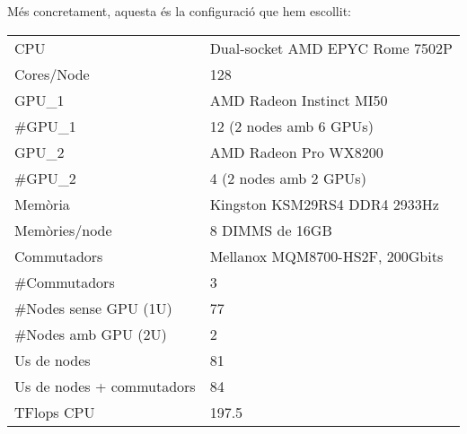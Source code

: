 Més concretament, aquesta és la configuració que hem escollit:
\begin{table}[H]
\begin{adjustwidth}{-1.0in}{-1.0in}
\begin{center}
\begin{tabular}{l|l}
\hline
    {\cellcolor[HTML]{EFEFEF}CPU}         & {\cellcolor[HTML]{EFEFEF}Dual-socket AMD EPYC Rome 7502P \cite{cpu_amd_7502_buy}} \\ 
Cores/Node                                       & 128                                             \\ 
    {\cellcolor[HTML]{EFEFEF}GPU\_1}                       & {\cellcolor[HTML]{EFEFEF}AMD Radeon Instinct MI50 \cite{gpu_mi50}} \\ 
\#GPU\_1                                           & 12 (2 nodes amb 6 GPUs)                         \\
    {\cellcolor[HTML]{EFEFEF}GPU\_2}                       & {\cellcolor[HTML]{EFEFEF}AMD Radeon Pro WX8200 \cite{gpu_pro_8200}} \\ 
\#GPU\_2                                           & 4 (2 nodes amb 2 GPUs)                         \\
    {\cellcolor[HTML]{EFEFEF}Memòria}     & {\cellcolor[HTML]{EFEFEF}Kingston KSM29RS4 DDR4 2933Hz \cite{mem2}}   \\
{\color[HTML]{000000}Memòries/node}             & {\color[HTML]{000000}8 DIMMS de 16GB}          \\ 
    {\cellcolor[HTML]{EFEFEF}Commutadors} & {\cellcolor[HTML]{EFEFEF}Mellanox MQM8700-HS2F, 200Gbits \cite{mellanox_mqm8700-hs2f}} \\ 
{\color[HTML]{000000}\#Commutadors}             & {\color[HTML]{000000}3}                        \\ 
{\cellcolor[HTML]{EFEFEF}\#Nodes sense GPU (1U)}    & {\cellcolor[HTML]{EFEFEF}77}                       \\
{\color[HTML]{000000}\#Nodes amb GPU (2U)}      & {\color[HTML]{000000}2}                        \\
{\cellcolor[HTML]{EFEFEF}Us de nodes}               & {\cellcolor[HTML]{EFEFEF}81}                       \\
{\color[HTML]{000000}Us de nodes + commutadors} & {\color[HTML]{000000}84}                       \\ \hline
{\cellcolor[HTML]{EFEFEF}TFlops CPU}                & {\cellcolor[HTML]{EFEFEF}197.5}                    \\

\end{tabular}
\end{center}
\end{adjustwidth}
\end{table}

